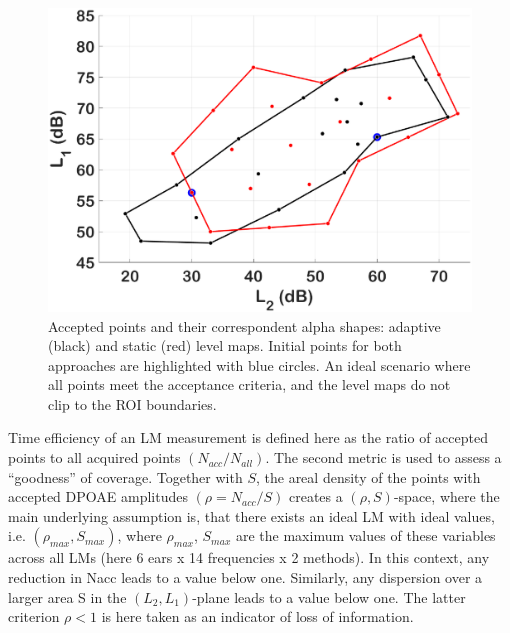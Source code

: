 \documentclass[journal,twoside,web]{ieeecolor2}
\begin{document}
\begin{figure}[ht]
\centerline{\includegraphics[width=\columnwidth]{Fig_3_connectivity.eps}}
\caption{Accepted points and their correspondent alpha shapes: adaptive (black) and static (red) level maps.
Initial points for both approaches are highlighted with blue circles.
An ideal scenario where all points meet the acceptance criteria, and the level maps do not clip to the ROI boundaries.}
\label{fig_CNT}
\end{figure}

Time efficiency of an LM measurement is defined here as the ratio of accepted points to all acquired points $(N_{acc}/N_{all})$.
The second metric is used to assess a “goodness” of coverage.
Together with $S$, the areal density of the points with accepted DPOAE amplitudes $(\rho = N_{acc} / S)$ creates a $(\rho, S)$-space, where the main underlying assumption is, that there exists an ideal LM with ideal values, i.e.
$(\rho _{max}, S_{max})$, where $\rho _{max}$, $S_{max}$ are the maximum values of these variables across all LMs (here 6 ears x 14 frequencies x 2 methods).
In this context, any reduction in Nacc leads to a value below one.
Similarly, any dispersion over a larger area S in the $(L_2, L_1)$-plane leads to a value below one.
The latter criterion $\rho < 1$  is here taken as an indicator of loss of information.
\end{document}
